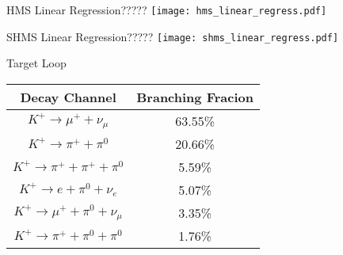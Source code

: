 \begin{Mfigure}{HMS Linear Regression?????}
  \centering
  \texttt{[image: hms\_linear\_regress.pdf]}
  \caption{All HMS Carbon-12 fit with a weighted linear regression using least squares.}
  \label{fig:3-4_hms_linear_regress}
\end{Mfigure}

\begin{Mfigure}{SHMS Linear Regression?????}
  \centering
  \texttt{[image: shms\_linear\_regress.pdf]}
  \caption{All SHMS Carbon-12 fit with a weighted linear regression using least squares.}
  \label{fig:3-4_shms_linear_regress}
\end{Mfigure}

%
%

\begin{Mtable}{Target Loop}
  \centering
  \begin{tabular}{|c|c|}
    \hline
    \textbf{Decay Channel} & \textbf{Branching Fracion} \\
    \hline
    $K^+\rightarrow \mu^++\nu_{\mu}$ & 63.55\% \\
    $K^+\rightarrow \pi^++\pi^0$ & 20.66\% \\
    $K^+\rightarrow \pi^++\pi^++\pi^0$ & 5.59\% \\
    $K^+\rightarrow e+\pi^0+\nu_e$ & 5.07\% \\
    $K^+\rightarrow \mu^++\pi^0+\nu_{\mu}$ & 3.35\% \\
    $K^+\rightarrow \pi^++\pi^0+\pi^0$ & 1.76\% \\
    \hline
    \end{tabular}
  \caption{Most probable decay channels of $K^+$ and their respective branching fractions. There are many decay channels for the kaon but these make up >99.98\% of the kaon decay's phase space.}
  \label{tab:4-5_kaon_decay}
\end{Mtable}
